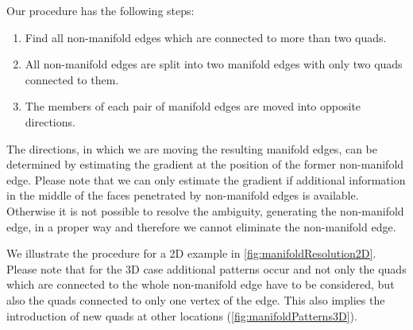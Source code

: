 Our procedure has the following steps:
\begin{enumerate}
\item Find all non-manifold edges which are connected to more than two \acp{quad}.
\item All non-manifold edges are split into two manifold edges with only two \acp{quad} connected to them.
\item The members of each pair of manifold edges are moved into opposite directions. 
\end{enumerate}
The directions, in which we are moving the resulting manifold edges, can be determined by estimating the gradient at the position of the former non-manifold edge. Please note that we can only estimate the gradient if additional information in the middle of the faces penetrated by non-manifold edges is available. Otherwise it is not possible to resolve the ambiguity, generating the non-manifold edge, in a proper way and therefore we cannot eliminate the non-manifold edge. 

We illustrate the procedure for a 2D example in \autoref{fig:manifoldResolution2D}. Please note that for the 3D case additional patterns occur and not only the \acp{quad} which are connected to the whole non-manifold edge have to be considered, but also the \acp{quad} connected to only one vertex of the edge. This also implies the introduction of new \acp{quad} at other locations (\autoref{fig:manifoldPatterns3D}).

